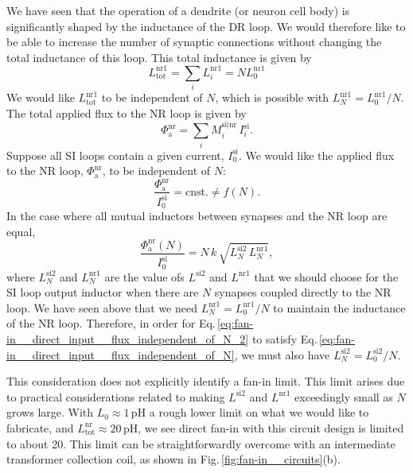 \documentclass[twocolumn]{article}
\begin{document}
We have seen that the operation of a dendrite (or neuron cell body) is significantly shaped by the inductance of the DR loop. We would therefore like to be able to increase the number of synaptic connections without changing the total inductance of this loop. This total inductance is given by
\begin{equation}
\label{eq:fan-in__direct_input__si_inductance}
L^{\mathrm{nr1}}_{\mathrm{tot}} = \sum_i L^{\mathrm{nr1}}_i = N L^{\mathrm{nr1}}_0
\end{equation}
We would like $L^{\mathrm{nr1}}_{\mathrm{tot}}$ to be independent of $N$, which is possible with $L^{\mathrm{nr1}}_N = L^{\mathrm{nr1}}_0/N$. The total applied flux to the NR loop is given by
\begin{equation}
\label{eq:fan-in__direct_input__applied_flux}
\Phi_{\mathrm{a}}^{\mathrm{nr}} = \sum_i M_i^{\mathrm{si|nr}} \, I_i^{\mathrm{si}}.
\end{equation}
Suppose all SI loops contain a given current, $I_0^{\mathrm{si}}$. We would like the applied flux to the NR loop, $\Phi_{\mathrm{a}}^{\mathrm{nr}}$, to be independent of $N$:
\begin{equation}
\label{eq:fan-in__direct_input__flux_independent_of_N}
\frac{ \Phi_{\mathrm{a}}^{\mathrm{nr}} }{ I_0^{\mathrm{si}} } = \mathrm{cnst.} \neq f(N).
\end{equation}
In the case where all mutual inductors between synapses and the NR loop are equal,
\begin{equation}
\label{eq:fan-in__direct_input__flux_independent_of_N_2}
\frac{ \Phi_{\mathrm{a}}^{\mathrm{nr}}(N) }{ I_0^{\mathrm{si}} } = N\,k\,\sqrt{ L_N^{\mathrm{si2}} \, L_N^{\mathrm{nr1}}},
\end{equation}
where $L_N^{\mathrm{si2}}$ and $L_N^{\mathrm{nr1}}$ are the value ofs $L^{\mathrm{si2}}$ and $L^{\mathrm{nr1}}$ that we should choose for the SI loop output inductor when there are $N$ synapses coupled directly to the NR loop. We have seen above that we need $L_N^{\mathrm{nr1}} = L_0^{\mathrm{nr1}}/N$ to maintain the inductance of the NR loop. Therefore, in order for Eq.\,\ref{eq:fan-in__direct_input__flux_independent_of_N_2} to satisfy Eq.\,\ref{eq:fan-in__direct_input__flux_independent_of_N}, we must also have $L_N^{\mathrm{si2}} = L_0^{\mathrm{si2}}/N$.

This consideration does not explicitly identify a fan-in limit. This limit arises due to practical considerations related to making $L^{\mathrm{si2}}$ and $L^{\mathrm{nr1}}$ exceedingly small as $N$ grows large. With $L_0 \approx 1$\,pH a rough lower limit on what we would like to fabricate, and $L_{\mathrm{tot}}^{\mathrm{nr}} \approx 20$\,pH, we see direct fan-in with this circuit design is limited to about 20. This limit can be straightforwardly overcome with an intermediate transformer collection coil, as shown in Fig.\,\ref{fig:fan-in__circuits}(b).
\end{document}
